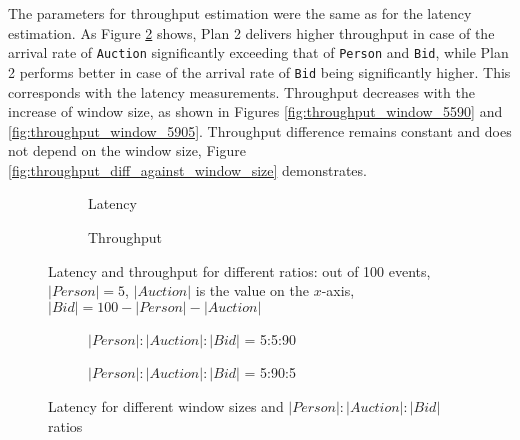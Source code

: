 The parameters for throughput estimation were the same as for the latency estimation. As Figure \ref{fig:throughput_ratio} shows, Plan 2 delivers higher throughput in case of the arrival rate of \texttt{Auction} significantly exceeding that of \texttt{Person} and \texttt{Bid}, while Plan 2 performs better in case of the arrival rate of \texttt{Bid} being significantly higher. This corresponds with the latency measurements. Throughput decreases with the increase of window size, as shown in Figures \ref{fig:throughput_window_5590} and \ref{fig:throughput_window_5905}. Throughput difference remains constant and does not depend on the window size, Figure \ref{fig:throughput_diff_against_window_size} demonstrates.

\begin{figure}[!ht]
    \begin{subfigure}[b]{0.45\textwidth}
            
            \captionsetup{justification=justified}
            \caption{Latency}
            \label{fig:latency_ratio}
    \end{subfigure}
    \hspace{5mm}
    \begin{subfigure}[b]{0.45\textwidth}
            
            \captionsetup{justification=justified}
            \caption{Throughput}
            \label{fig:throughput_ratio}
    \end{subfigure}
    \caption{Latency and throughput for different ratios: out of 100 events, $|Person| = 5$, $|Auction|$ is the value on the $x$-axis, $|Bid| = 100 - |Person| - |Auction|$}
    \label{fig:ratio_plots}
\end{figure}

\begin{figure}[!ht]
    \centering
    \begin{subfigure}[b]{0.45\textwidth}
            
            \captionsetup{justification=justified}
            \caption{$|Person|:|Auction|:|Bid|$ = 5:5:90}
            \label{fig:latency_window_5590}
    \end{subfigure}
    \hspace{1.25mm}
    \begin{subfigure}[b]{0.45\textwidth}
            
            \captionsetup{justification=justified}
            \caption{$|Person|:|Auction|:|Bid|$ = 5:90:5}
            \label{fig:latency_window_5905}
    \end{subfigure}
    \caption{Latency for different window sizes and $|Person|:|Auction|:|Bid|$ ratios}
    \label{fig:latency_plots}
\end{figure}

